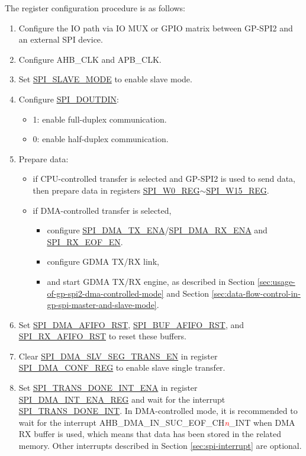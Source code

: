 \documentclass[main\_\_EN.tex]{subfiles}
\begin{document}
The register configuration procedure is as follows:
\begin{enumerate}
    \item Configure the IO path via IO MUX or GPIO matrix between GP-SPI2 and an external SPI device.
    \item Configure AHB\_CLK and APB\_CLK.
    \item Set \hyperref[fielddesc:SPISLAVEMODE]{SPI\_SLAVE\_MODE} to enable slave mode.
    \item Configure \hyperref[fielddesc:SPIDOUTDIN]{SPI\_DOUTDIN}:
    \begin{itemize}
        \item 1: enable full-duplex communication.
        \item 0: enable half-duplex communication.
    \end{itemize}
    \item Prepare data:
    \begin{itemize}
        \item if CPU-controlled transfer is selected and GP-SPI2 is used to send data, then prepare data in registers \hyperref[regdesc:SPIW0REG]{SPI\_W0\_REG}$\sim$\hyperref[regdesc:SPIW15REG]{SPI\_W15\_REG}.
        \item if DMA-controlled transfer is selected,
        \begin{itemize}
            \item configure \hyperref[fielddesc:SPIDMATXENA]{SPI\_DMA\_TX\_ENA}/\hyperref[fielddesc:SPIDMARXENA]{SPI\_DMA\_RX\_ENA} and \hyperref[fielddesc:SPIRXEOFEN]{SPI\_RX\_EOF\_EN}.
            \item configure GDMA TX/RX link,
            \item and start GDMA TX/RX engine, as described in Section \ref{sec:usage-of-gp-spi2-dma-controlled-mode} and Section \ref{sec:data-flow-control-in-gp-spi-master-and-slave-mode}.
        \end{itemize}
    \end{itemize}
    \item Set \hyperref[fielddesc:SPIDMAAFIFORST]{SPI\_DMA\_AFIFO\_RST}, \hyperref[fielddesc:SPIBUFAFIFORST]{SPI\_BUF\_AFIFO\_RST}, and \hyperref[fielddesc:SPIRXAFIFORST]{SPI\_RX\_AFIFO\_RST} to reset these buffers.
    \item Clear \hyperref[fielddesc:SPIDMASLVSEGTRANSEN]{SPI\_DMA\_SLV\_SEG\_TRANS\_EN} in register \hyperref[regdesc:SPIDMACONFREG]{SPI\_DMA\_CONF\_REG} to enable slave single transfer.
    \item Set \hyperref[fielddesc:SPITRANSDONEINTENA]{SPI\_TRANS\_DONE\_INT\_ENA} in register \hyperref[regdesc:SPIDMAINTENAREG]{SPI\_DMA\_INT\_ENA\_REG} and wait for the interrupt \hyperref[int:SPITRANSDONEINT]{SPI\_TRANS\_DONE\_INT}. In DMA-controlled mode, it is recommended to wait for the interrupt AHB\_DMA\_IN\_SUC\_EOF\_CH\textcolor{red}{\it{n}}\_INT when DMA RX buffer is used, which means that data has been stored in the related memory. Other interrupts described in Section \ref{sec:spi-interrupt} are optional.
\end{enumerate}
\end{document}
